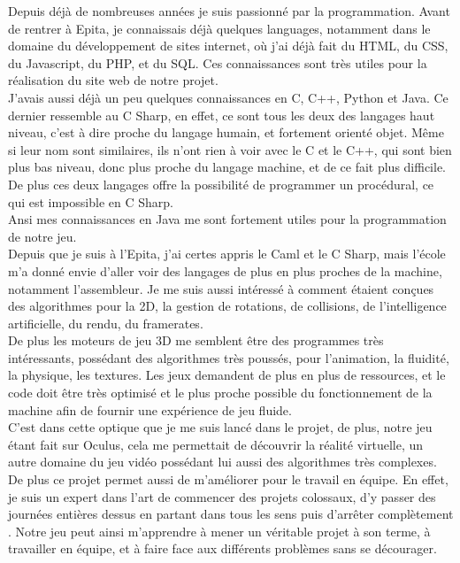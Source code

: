 \documentclass[12pt]{article}
\begin{document}
Depuis déjà de nombreuses années je suis passionné par la programmation. Avant de rentrer à Epita, je connaissais déjà quelques languages, notamment dans le domaine du développement de sites internet, où j'ai déjà fait du \gls{HTML}, du \gls{CSS}, du \gls{Javascript}, du \gls{PHP}, et du \gls{SQL}. Ces connaissances sont très utiles pour la réalisation du site web de notre projet.\\
J'avais aussi déjà un peu quelques connaissances en \gls{C}, \gls{C++}, \gls{Python} et \gls{Java}. Ce dernier ressemble au \gls{C Sharp}, en effet, ce sont tous les deux des langages haut niveau, c'est à dire proche du langage humain, et fortement orienté objet. Même si leur nom sont similaires, ils n'ont rien à voir avec le C et le C++, qui sont bien plus bas niveau, donc plus proche du langage machine, et de ce fait plus difficile. De plus ces deux langages offre la possibilité de programmer un procédural, ce qui est impossible en C Sharp.\\
Ansi mes connaissances en Java me sont fortement utiles pour la programmation de notre jeu.\\

Depuis que je suis à l'Epita, j'ai certes appris le \gls{Caml} et le C Sharp, mais l'école m'a donné envie d'aller voir des langages de plus en plus proches de la machine, notamment l'\gls{assembleur}. Je me suis aussi intéressé à comment étaient conçues des algorithmes pour la 2D, la gestion de rotations, de collisions, de l'intelligence artificielle, du rendu, du \gls{framerates}.\\
De plus les moteurs de jeu 3D me semblent être des programmes très intéressants, possédant des algorithmes très poussés, pour l'animation, la fluidité, la physique, les textures. Les jeux demandent de plus en plus de ressources, et le code doit être très optimisé et le plus proche possible du fonctionnement de la machine afin de fournir une expérience de jeu fluide.\\

C'est dans cette optique que je me suis lancé dans le projet, de plus, notre jeu étant fait sur Oculus, cela me permettait de découvrir la réalité virtuelle, un autre domaine du jeu vidéo possédant lui aussi des algorithmes très complexes.\\
De plus ce projet permet aussi de m'améliorer pour le travail en équipe. En effet, je suis un expert dans l'art de \og commencer des projets colossaux, d'y passer des journées entières dessus en partant dans tous les sens puis d'arrêter complètement \fg{}. Notre jeu peut ainsi m'apprendre à mener un véritable projet à son terme, à travailler en équipe, et à faire face aux différents problèmes sans se décourager.
\end{document}
